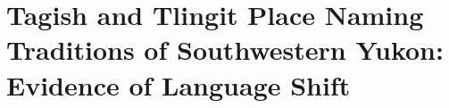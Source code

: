 \chapter[Tagish and Tlingit Place Naming Traditions of Southwestern Yukon]{\vspace{-25pt}Tagish and Tlingit Place Naming Traditions of Southwestern Yukon: Evidence of Language Shift}



\def\authorlast{Moore}

\renewcommand{\beginchapter}{\pageref{moore-ch-begin}}
\renewcommand{\finishchapter}{\pageref{moore-ch-end}}
\label{moore-ch-begin}



\thispagestyle{firststyle}




